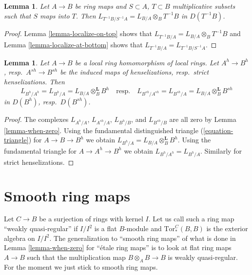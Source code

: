 \documentclass[10pt,a4paper]{article}
\theoremstyle{plain}
\newtheorem{lemma}[subsection]{Lemma}
\theoremstyle{definition}
\theoremstyle{remark}
\numberwithin{equation}{subsection}
\begin{document}
\begin{lemma}
\label{lemma-localize}
Let $A \to B$ be ring maps and $S \subset A$, $T \subset B$ multiplicative
subsets such that $S$ maps into $T$.
Then $L_{T^{-1}B/S^{-1}A} = L_{B/A} \otimes_B T^{-1}B$
in $D(T^{-1}B)$.
\end{lemma}

\begin{proof}
Lemma \ref{lemma-localize-on-top} shows that
$L_{T^{-1}B/A} = L_{B/A} \otimes_B T^{-1}B$
and Lemma \ref{lemma-localize-at-bottom}
shows that $L_{T^{-1}B/A} = L_{T^{-1}B/S^{-1}A}$.
\end{proof}

\begin{lemma}
\label{lemma-cotangent-complex-henselization}
Let $A \to B$ be a local ring homomorphism of local rings.
Let $A^h \to B^h$, resp.\ $A^{sh} \to B^{sh}$ be the induced
maps of henselizations, resp.\ strict henselizations.
Then
$$
L_{B^h/A^h} = L_{B^h/A} = L_{B/A} \otimes_B^\mathbf{L} B^h
\quad\text{resp.}\quad
L_{B^{sh}/A^{sh}} = L_{B^{sh}/A} = L_{B/A} \otimes_B^\mathbf{L} B^{sh}
$$
in $D(B^h)$, resp.\ $D(B^{sh})$.
\end{lemma}

\begin{proof}
The complexes $L_{A^h/A}$, $L_{A^{sh}/A}$, $L_{B^h/B}$, and
$L_{B^{sh}/B}$ are all zero by Lemma \ref{lemma-when-zero}.
Using the fundamental distinguished triangle (\ref{equation-triangle})
for $A \to B \to B^h$ we obtain
$L_{B^h/A} = L_{B/A} \otimes_B^\mathbf{L} B^h$.
Using the fundamental triangle for $A \to A^h \to B^h$
we obtain $L_{B^h/A^h} = L_{B^h/A}$.
Similarly for strict henselizations.
\end{proof}




\section{Smooth ring maps}
\label{section-smooth}

\noindent
Let $C \to B$ be a surjection of rings with kernel $I$. Let us call such
a ring map ``weakly quasi-regular'' if $I/I^2$ is a flat $B$-module and
$\text{Tor}_*^C(B, B)$ is the exterior algebra on $I/I^2$.
The generalization to ``smooth ring maps'' of what is done in
Lemma \ref{lemma-when-zero} for ``\'etale ring maps'' is to look
at flat ring maps $A \to B$ such that the multiplication map
$B \otimes_A B \to B$ is weakly quasi-regular. For the moment we just stick to
smooth ring maps.
\end{document}
